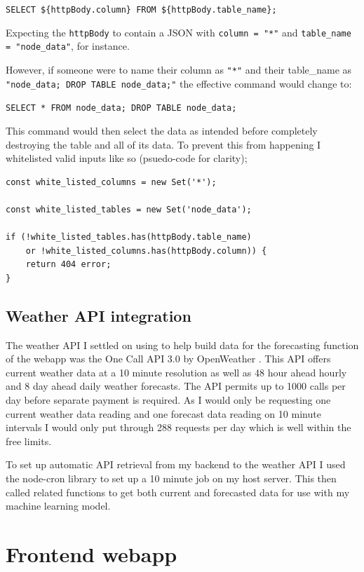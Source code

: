 \verb|SELECT ${httpBody.column} FROM ${httpBody.table_name};|

Expecting the \verb|httpBody| to contain a JSON with \texttt{column = "*"} and
\texttt{table\_name = "node\_data"}, for instance.

However, if someone were to name their column as \texttt{"*"} and their
table\_name as \texttt{"node\_data; DROP TABLE node\_data;"} the effective
command would change to:

\verb|SELECT * FROM node_data; DROP TABLE node_data;|

This command would then select the data as intended before completely destroying
the table and all of its data. To prevent this from happening I whitelisted
valid inputs like so (psuedo-code for clarity);

\begin{verbatim}
const white_listed_columns = new Set('*');

const white_listed_tables = new Set('node_data');

if (!white_listed_tables.has(httpBody.table_name) 
    or !white_listed_columns.has(httpBody.column)) {
    return 404 error;
}
\end{verbatim}

\subsection{Weather API integration}

The weather API I settled on using to help build data for the forecasting
function of the webapp was the One Call API 3.0 by OpenWeather
\cite{openweatherAPI}. This API offers current weather data at a 10 minute
resolution as well as 48 hour ahead hourly and 8 day ahead daily weather
forecasts. The API permits up to 1000 calls per day before separate payment is
required. As I would only be requesting one current weather data reading and one
forecast data reading on 10 minute intervals I would only put through 288
requests per day which is well within the free limits.

To set up automatic API retrieval from my backend to the weather API I used the
node-cron library \cite{node-cron} to set up a 10 minute job on my host server.
This then called related functions to get both current and forecasted data for
use with my machine learning model.

\section{Frontend webapp}\label{sec:front-end}

